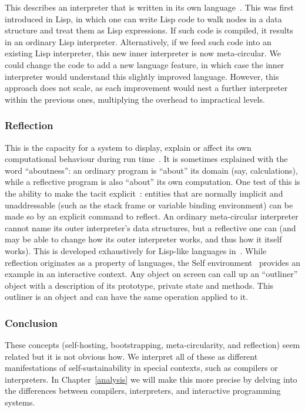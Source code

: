 \documentclass[ twoside,openright,titlepage,numbers=noenddot,headinclude,footinclude,cleardoublepage=empty,abstract=on,
                BCOR=5mm,paper=a4,fontsize=11pt
                ]{scrreprt}
\theoremstyle{definition}
\begin{document}
This describes an interpreter that is written in its own
language~\parencite{Metac}. This was first introduced in Lisp, in which
one can write Lisp code to walk nodes in a data structure and treat them
as Lisp expressions. If such code is compiled, it results in an ordinary
Lisp interpreter. Alternatively, if we feed such code into an existing
Lisp interpreter, this new inner interpreter is now meta-circular. We
could change the code to add a new language feature, in which case the
inner interpreter would understand this slightly improved language.
However, this approach does not scale, as each improvement would nest a
further interpreter within the previous ones, multiplying the overhead
to impractical levels.

\hypertarget{reflection}{\subsubsection{Reflection}\label{reflection}}

This is the capacity for a system to display, explain or affect its own
computational behaviour during run time~\parencite{CompRefl}. It is
sometimes explained with the word ``aboutness'': an ordinary program is
``about'' its domain (say, calculations), while a reflective program is
also ``about'' its own computation. One test of this is the ability to
make the tacit explicit~\parencite{ProcRefl}: entities that are normally
implicit and unaddressable (such as the stack frame or variable binding
environment) can be made so by an explicit command to reflect. An
ordinary meta-circular interpreter cannot name its outer interpreter's
data structures, but a reflective one can (and may be able to change how
its outer interpreter works, and thus how it itself works). This is
developed exhaustively for Lisp-like languages in~\parencite{ProcRefl}.
While reflection originates as a property of languages, the Self
environment~\parencite{Self} provides an example in an interactive
context. Any object on screen can call up an ``outliner'' object with a
description of its prototype, private state and methods. This outliner
is an object and can have the same operation applied to it.

\hypertarget{conclusion}{\subsubsection{Conclusion}\label{conclusion}}

These concepts (self-hosting, bootstrapping, meta-circularity, and
reflection) seem related but it is not obvious how. We interpret all of
these as different manifestations of self-sustainability in special
contexts, such as compilers or interpreters. In Chapter~\ref{analysis}
we will make this more precise by delving into the differences between
compilers, interpreters, and interactive programming systems.
\end{document}

